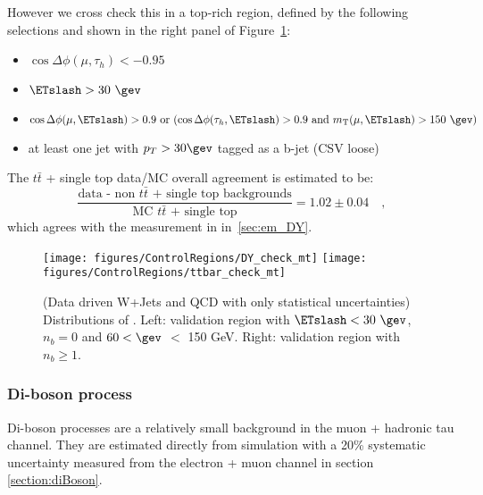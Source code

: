 However we cross check this in a \tmth top-rich region, 
defined by the following selections and shown in the right 
panel of Figure~\ref{fig:mt_dy_tt}:
\begin{itemize}
  \item $\cos{\Delta \phi (\mu,\tau_{h})}<-0.95$
  \item $\ETslash>30~\gev$
  \item $\cos{\Delta \phi (\mu,\ETslash)} > 0.9~\text{or}~(\cos{\Delta \phi (\tau_{h},\ETslash)} > 0.9~\text{and}~m_{\text{T}}(\mu,\ETslash) > 150~\gev)$
  \item at least one jet with $p_T>30\gev$ tagged as a b-jet (CSV loose)
\end{itemize}
The $t\bar{t}$ + single top data/MC overall agreement is estimated to be:
\begin{equation}\label{eq:mt_tt}
\frac{\text{data - non $t\bar{t}$ + single top backgrounds}}{\text{MC $t\bar{t}$ + single top}}  =  1.02 \pm 0.04 \quad,
\end{equation}
which agrees with the measurement in in~\ref{sec:em_DY}. 

\begin{figure}\centering
  \texttt{[image: figures/ControlRegions/DY\_check\_mt]}
  \texttt{[image: figures/ControlRegions/ttbar\_check\_mt]}
  \caption{\label{fig:mt_dy_tt} (Data driven W+Jets and QCD with only statistical uncertainties) 
Distributions of \meffmtau. Left:
    validation region with $\ETslash<30~\gev$, $n_b = 0$ and $60<\gev$ \meffmtau $<$ 150 GeV.  Right:
    validation region with $n_b\geq1$.}
\end{figure}

\subsubsection{Di-boson process}
Di-boson processes are a relatively small background in the muon + 
hadronic tau channel. They are estimated directly from simulation with 
a 20\% systematic uncertainty measured from the electron + muon channel 
in section \ref{section:diBoson}.
    
